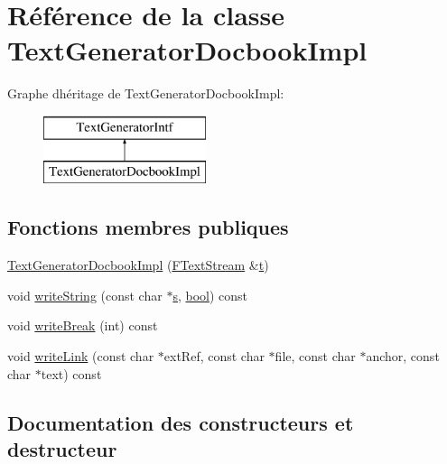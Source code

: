 \hypertarget{class_text_generator_docbook_impl}{}\section{Référence de la classe Text\+Generator\+Docbook\+Impl}
\label{class_text_generator_docbook_impl}
Graphe d\textquotesingle{}héritage de Text\+Generator\+Docbook\+Impl\+:\begin{figure}[H]
\begin{center}
\leavevmode
\includegraphics[height=2.000000cm]{class_text_generator_docbook_impl}
\end{center}
\end{figure}
\subsection*{Fonctions membres publiques}
\begin{DoxyCompactItemize}
\item 
\hyperlink{class_text_generator_docbook_impl_aacc7dff0ee499c32eb66240161d63057}{Text\+Generator\+Docbook\+Impl} (\hyperlink{class_f_text_stream}{F\+Text\+Stream} \&\hyperlink{058__bracket__recursion_8tcl_a69e959f6901827e4d8271aeaa5fba0fc}{t})
\item 
void \hyperlink{class_text_generator_docbook_impl_a88dd87629b351caf150ae057d37d6591}{write\+String} (const char $\ast$\hyperlink{060__command__switch_8tcl_a011c73f2dbb87635a3b4206c72355f6e}{s}, \hyperlink{qglobal_8h_a1062901a7428fdd9c7f180f5e01ea056}{bool}) const 
\item 
void \hyperlink{class_text_generator_docbook_impl_a8a539fcbc77039d9b8bec7f6617bad62}{write\+Break} (int) const 
\item 
void \hyperlink{class_text_generator_docbook_impl_a5fed19be0cb83b69fac2579715c18402}{write\+Link} (const char $\ast$ext\+Ref, const char $\ast$file, const char $\ast$anchor, const char $\ast$text) const 
\end{DoxyCompactItemize}


\subsection{Documentation des constructeurs et destructeur}
\hypertarget{class_text_generator_docbook_impl_aacc7dff0ee499c32eb66240161d63057}{}

